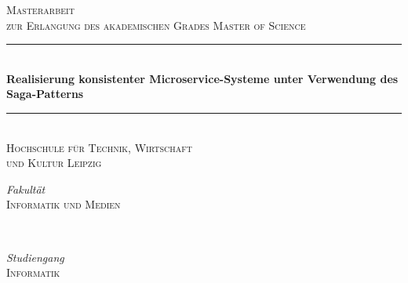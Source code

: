 %
%
%
% 
%
	\begin{titlepage} 
		\newcommand{\HRule}{\rule{\linewidth}{0.5mm}}
		
		\center
		
		
		\textsc{\LARGE Masterarbeit}\\[1cm] 
		
		\textsc{\Large zur Erlangung des akademischen Grades Master of Science}\\[1cm]
		
		
		\HRule\\[0.4cm]

		{\huge\bfseries Realisierung konsistenter Microservice-Systeme unter Verwendung des Saga-Patterns}\\[0.4cm]
		
		\HRule\\[1.5cm]
		
		\textsc{\Large Hochschule für Technik, Wirtschaft\\und Kultur Leipzig}\\[1.5cm] %
		
		\begin{minipage}{0.4\textwidth}
			\begin{flushleft}
				\large
				\textit{Fakultät}\\
				\textsc{Informatik und Medien}
			\end{flushleft}
		\end{minipage}
		~
		\begin{minipage}{0.4\textwidth}
			\begin{flushright}
				\large
				\textit{Studiengang}\\
				\textsc{\large Informatik}
			\end{flushright}
		\end{minipage}
		

\end{titlepage}
